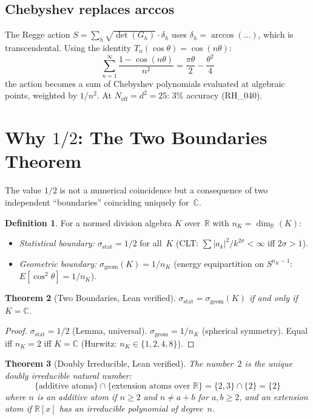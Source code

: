 \documentclass[12pt]{article}
\newtheorem{theorem}{Theorem}[section]
\theoremstyle{definition}
\newtheorem{definition}[theorem]{Definition}
\theoremstyle{remark}
\newcommand{\CC}{\mathbb{C}}
\newcommand{\RR}{\mathbb{R}}
\begin{document}
\subsection{Chebyshev replaces arccos}

The Regge action $S = \sum_h \sqrt{\det(G_h)} \cdot \delta_h$
uses $\delta_h = \arccos(\ldots)$, which is transcendental.
Using the identity $T_n(\cos\theta) = \cos(n\theta)$:
\[
  \sum_{n=1}^{\infty} \frac{1 - \cos(n\theta)}{n^2}
  = \frac{\pi\theta}{2} - \frac{\theta^2}{4}
\]
the action becomes a sum of Chebyshev polynomials evaluated
at algebraic points, weighted by $1/n^2$.
At $N_{\mathrm{eff}} = d^2 = 25$: 3\% accuracy (RH\_040).

\section{Why $1/2$: The Two Boundaries Theorem}
\label{sec:two}

The value $1/2$ is not a numerical coincidence but a consequence
of two independent ``boundaries'' coinciding uniquely for~$\CC$.

\begin{definition}
For a normed division algebra $K$ over~$\RR$ with
$n_K = \dim_\RR(K)$:
\begin{itemize}
\item \emph{Statistical boundary:}
  $\sigma_{\mathrm{stat}} = 1/2$ for all~$K$
  (CLT: $\sum |a_k|^2/k^{2\sigma} < \infty$ iff $2\sigma > 1$).
\item \emph{Geometric boundary:}
  $\sigma_{\mathrm{geom}}(K) = 1/n_K$
  (energy equipartition on $S^{n_K - 1}$: $E[\cos^2\theta] = 1/n_K$).
\end{itemize}
\end{definition}

\begin{theorem}[Two Boundaries, Lean verified]\label{thm:two}
$\sigma_{\mathrm{stat}} = \sigma_{\mathrm{geom}}(K)$
if and only if $K = \CC$.
\end{theorem}

\begin{proof}
$\sigma_{\mathrm{stat}} = 1/2$ (Lemma, universal).
$\sigma_{\mathrm{geom}} = 1/n_K$ (spherical symmetry).
Equal iff $n_K = 2$ iff $K = \CC$ (Hurwitz: $n_K \in \{1,2,4,8\}$).
\end{proof}

\begin{theorem}[Doubly Irreducible, Lean verified]\label{thm:doubly}
The number~$2$ is the unique \emph{doubly irreducible} natural number:
\[
  \{\text{additive atoms}\} \cap \{\text{extension atoms over } \RR\}
  = \{2, 3\} \cap \{2\} = \{2\}
\]
where $n$ is an additive atom if $n \geq 2$ and $n \neq a + b$
for $a, b \geq 2$, and an extension atom if $\RR[x]$ has an
irreducible polynomial of degree~$n$.
\end{theorem}
\end{document}
